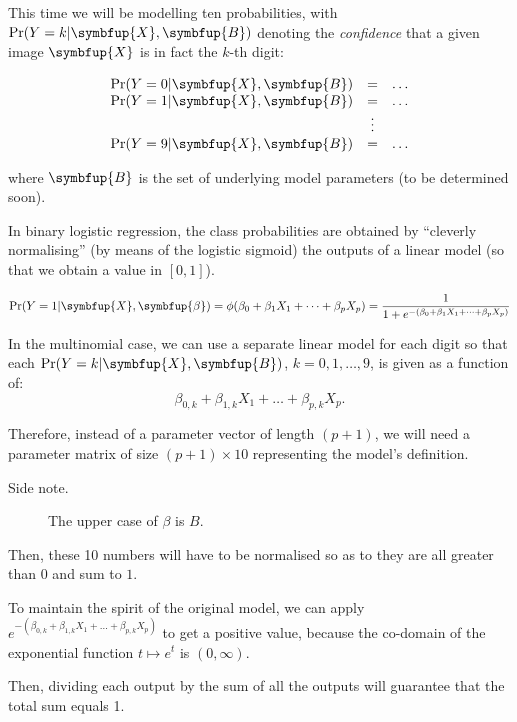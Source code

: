 \documentclass[10pt,b5paper,krantz1]{krantz}
\renewcommand{\mathbf}[1]{\symbfup{#1}}
\renewcommand{\boldsymbol}[1]{\symbfup{#1}}
\begin{document}
This time we will be modelling ten probabilities,
with
\(\Pr(Y=k|\mathbf{X},\mathbf{B})\) denoting the \emph{confidence} that a given image \(\mathbf{X}\)
is in fact the \(k\)-th digit:

\[
\begin{array}{lcl}
\Pr(Y=0|\mathbf{X},\mathbf{B})&=&\dots\\
\Pr(Y=1|\mathbf{X},\mathbf{B})&=&\dots\\
&\vdots&\\
\Pr(Y=9|\mathbf{X},\mathbf{B})&=&\dots\\
\end{array}
\]

where \(\mathbf{B}\) is the set of underlying model parameters
(to be determined soon).

In binary logistic regression,
the class probabilities are obtained by ``cleverly normalising'' (by means of the logistic sigmoid)
the outputs of a linear model (so that we obtain a value in \([0,1]\)).

\[
\Pr(Y=1|\mathbf{X},\boldsymbol\beta)=\phi(\beta_0 + \beta_1 X_1 +  \dots + \beta_p X_p)=\displaystyle\frac{1}{1+e^{-(\beta_0 + \beta_1 X_1 +  \dots + \beta_p X_p)}}
\]

In the multinomial case, we can use a separate linear model for each digit
so that each \(\Pr(Y=k|\mathbf{X},\mathbf{B})\), \(k=0,1,\dots,9\),
is given as a function of:
\[\beta_{0,k} + \beta_{1,k} X_{1} +  \dots + \beta_{p,k} X_{p}.\]

Therefore, instead of a parameter vector of length \((p+1)\),
we will need a parameter matrix of size \((p+1)\times 10\)
representing the model's definition.

\begin{description}
\item[Side note.]
The upper case of \(\beta\) is \(B\).
\end{description}

Then, these 10 numbers will have to be normalised
so as to they are all greater than \(0\) and sum to \(1\).

To maintain the spirit of the original model,
we can apply \(e^{-(\beta_{0,k} + \beta_{1,k} X_{1} + \dots + \beta_{p,k} X_{p})}\)
to get a positive value,
because the co-domain of the exponential function \(t\mapsto e^t\)
is \((0,\infty)\).

Then, dividing each output by the sum of all the outputs will guarantee that
the total sum equals 1.
\end{document}
